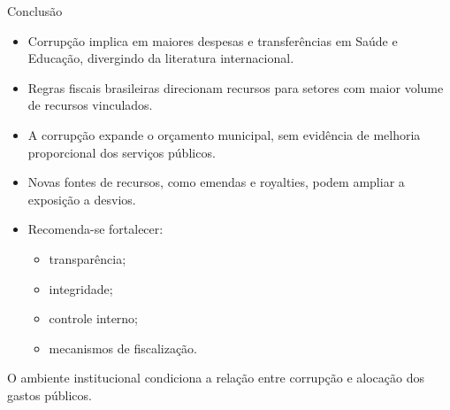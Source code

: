 \documentclass[
  10pt,
  ignorenonframetext,
  aspectratio=169,
  brazilian,
]{beamer}
\providecommand{\tightlist}{%
  \setlength{\itemsep}{0pt}\setlength{\parskip}{0pt}}
\begin{document}
\begin{frame}{Conclusão}
\protect{}\label{conclusuxe3o}
\begin{itemize}
\tightlist
\item
  Corrupção implica em maiores despesas e transferências em Saúde e
  Educação, divergindo da literatura internacional.
\item
  Regras fiscais brasileiras direcionam recursos para setores com maior
  volume de recursos vinculados.
\item
  A corrupção expande o orçamento municipal, sem evidência de melhoria
  proporcional dos serviços públicos.
\item
  Novas fontes de recursos, como emendas e royalties, podem ampliar a
  exposição a desvios.
\item
  Recomenda-se fortalecer:

  \begin{itemize}
  \tightlist
  \item
    transparência;
  \item
    integridade;
  \item
    controle interno;
  \item
    mecanismos de fiscalização.
  \end{itemize}
\end{itemize}

O ambiente institucional condiciona a relação entre corrupção e alocação
dos gastos públicos.
\end{frame}
\end{document}
